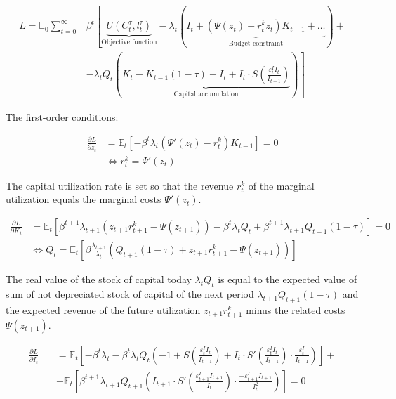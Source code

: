 \documentclass{pracamgr}
\numberwithin{equation}{section}
\begin{document}
\begin{align}
L = \mathbb{E}_{0} \sum\limits_{t=0}^{\infty} &\beta^{t} \left[\underbrace{U \left(C_{t}^{\tau}, l_{t}^{\tau} \right)}_\text{Objective function} - \lambda_{t} \left( \underbrace{I_{t} + \left(\Psi(z_{t}) - r_{t}^{k}z_{t}\right)K_{t-1} + \ldots}_\text{Budget constraint} \right) + \nonumber \right.  \\ 
& \left. - \lambda_{t} Q_{t} \left( \underbrace{K_{t} - K_{t-1} (1 - \tau) - I_{t}  + I_{t} \cdot S \left(\frac{\varepsilon_{t}^{I}I_{t}}{I_{t-1}} \right)}_\text{Capital accumulation} \right) \right]
\end{align}

The first-order conditions:

\begin{align}
\frac{\partial L}{\partial z_{t}} &= \mathbb{E}_{t} \left[ -\beta^{t} \lambda_{t} \left( \Psi'(z_{t}) - r_{t}^{k} \right) K_{t-1} \right] = 0 \nonumber \\
& \iff r_{t}^{k} = \Psi'(z_{t})
\end{align}

The capital utilization rate is set so that the revenue $r_{t}^{k}$ of the marginal utilization equals the marginal costs $\Psi'(z_{t})$.

\begin{align}
\frac{\partial L}{\partial K_{t}} &= \mathbb{E}_{t} \left[ \beta^{t+1} \lambda_{t+1} \left( z_{t+1}r_{t+1}^{k} - \Psi(z_{t+1}) \right) - \beta^{t} \lambda_{t}Q_{t} + \beta^{t+1} \lambda_{t+1}Q_{t+1}(1-\tau) \right] = 0 \nonumber \\
& \iff Q_{t} = \mathbb{E}_{t} \left[ \beta \frac{\lambda_{t+1}}{\lambda_{t}} \left( Q_{t+1}(1-\tau) + z_{t+1}r_{t+1}^{k} - \Psi(z_{t+1}) \right) \right]
\end{align}

The real value of the stock of capital today $\lambda_{t} Q_{t}$ is equal to the expected value of sum of not depreciated stock of capital of the next period $\lambda_{t+1}Q_{t+1}(1-\tau)$ and the expected revenue of the future utilization $ z_{t+1}r_{t+1}^{k}$ minus the related costs $\Psi(z_{t+1})$.

\begin{align}
\frac{\partial L}{\partial I_{t}} &= \mathbb{E}_{t} \left[ -\beta^{t} \lambda_{t} - \beta^{t} \lambda_{t} Q_{t} \left(-1 + S\left(\frac{\varepsilon_{t}^{I}I_{t}}{I_{t-1}} \right) + I_{t} \cdot S' \left(\frac{\varepsilon_{t}^{I}I_{t}}{I_{t-1}} \right) \cdot \frac{\varepsilon_{t}^{I}}{I_{t-1}} \right) \right] + \nonumber \\
\qquad &- \mathbb{E}_{t} \left[ \beta^{t+1} \lambda_{t+1} Q_{t+1} \left(I_{t+1} \cdot S' \left(\frac{\varepsilon_{t+1}^{I}I_{t+1}}{I_{t}} \right) \cdot \frac{-\varepsilon_{t+1}^{I}I_{t+1}}{I_{t}^{2}} \right) \right] = 0
\end{align}
\end{document}
